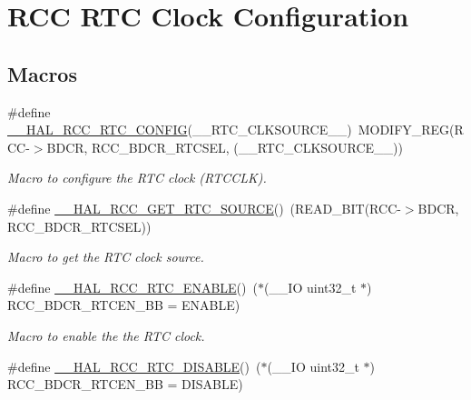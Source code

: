 \hypertarget{group___r_c_c___r_t_c___clock___configuration}{}\section{R\+CC R\+TC Clock Configuration}
\label{group___r_c_c___r_t_c___clock___configuration}
\subsection*{Macros}
\begin{DoxyCompactItemize}
\item 
\#define \hyperlink{group___r_c_c___r_t_c___clock___configuration_ga2d6c4c7e951bfd007d26988fbfe6eaa4}{\+\_\+\+\_\+\+H\+A\+L\+\_\+\+R\+C\+C\+\_\+\+R\+T\+C\+\_\+\+C\+O\+N\+F\+IG}(\+\_\+\+\_\+\+R\+T\+C\+\_\+\+C\+L\+K\+S\+O\+U\+R\+C\+E\+\_\+\+\_\+)~M\+O\+D\+I\+F\+Y\+\_\+\+R\+EG(R\+CC-\/$>$B\+D\+CR, R\+C\+C\+\_\+\+B\+D\+C\+R\+\_\+\+R\+T\+C\+S\+EL, (\+\_\+\+\_\+\+R\+T\+C\+\_\+\+C\+L\+K\+S\+O\+U\+R\+C\+E\+\_\+\+\_\+))
\begin{DoxyCompactList}\small\item\em Macro to configure the R\+TC clock (R\+T\+C\+C\+LK). \end{DoxyCompactList}\item 
\#define \hyperlink{group___r_c_c___r_t_c___clock___configuration_gad40d00ff1c984ebd011ea9f6e7f93c44}{\+\_\+\+\_\+\+H\+A\+L\+\_\+\+R\+C\+C\+\_\+\+G\+E\+T\+\_\+\+R\+T\+C\+\_\+\+S\+O\+U\+R\+CE}()~(R\+E\+A\+D\+\_\+\+B\+IT(R\+CC-\/$>$B\+D\+CR, R\+C\+C\+\_\+\+B\+D\+C\+R\+\_\+\+R\+T\+C\+S\+EL))
\begin{DoxyCompactList}\small\item\em Macro to get the R\+TC clock source. \end{DoxyCompactList}\item 
\#define \hyperlink{group___r_c_c___r_t_c___clock___configuration_gab7cc36427c31da645a0e38e181f8ce0f}{\+\_\+\+\_\+\+H\+A\+L\+\_\+\+R\+C\+C\+\_\+\+R\+T\+C\+\_\+\+E\+N\+A\+B\+LE}()~($\ast$(\+\_\+\+\_\+\+IO uint32\+\_\+t $\ast$) R\+C\+C\+\_\+\+B\+D\+C\+R\+\_\+\+R\+T\+C\+E\+N\+\_\+\+BB = E\+N\+A\+B\+LE)
\begin{DoxyCompactList}\small\item\em Macro to enable the the R\+TC clock. \end{DoxyCompactList}\item 
\#define \hyperlink{group___r_c_c___r_t_c___clock___configuration_gaab5eeb81fc9f0c8d4450069f7a751855}{\+\_\+\+\_\+\+H\+A\+L\+\_\+\+R\+C\+C\+\_\+\+R\+T\+C\+\_\+\+D\+I\+S\+A\+B\+LE}()~($\ast$(\+\_\+\+\_\+\+IO uint32\+\_\+t $\ast$) R\+C\+C\+\_\+\+B\+D\+C\+R\+\_\+\+R\+T\+C\+E\+N\+\_\+\+BB = D\+I\+S\+A\+B\+LE)

\end{DoxyCompactItemize}
